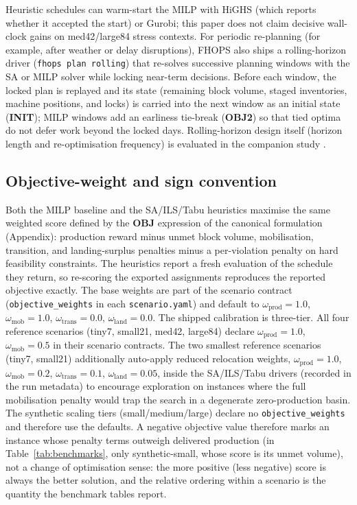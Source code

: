 Heuristic schedules can warm-start the MILP with HiGHS (which reports whether it accepted the start) or Gurobi; this paper does not claim decisive wall-clock gains on med42/large84 stress contexts. For periodic re-planning (for example, after weather or delay disruptions), FHOPS also ships a rolling-horizon driver (\texttt{fhops plan rolling}) that re-solves successive planning windows with the SA or MILP solver while locking near-term decisions. Before each window, the locked plan is replayed and its state (remaining block volume, staged inventories, machine positions, and locks) is carried into the next window as an initial state (\textbf{INIT}); MILP windows add an earliness tie-break (\textbf{OBJ2}) so that tied optima do not defer work beyond the locked days. Rolling-horizon design itself (horizon length and re-optimisation frequency) is evaluated in the companion study \cite{jaffray2026thesis}.

\subsection*{Objective-weight and sign convention}
Both the MILP baseline and the SA/ILS/Tabu heuristics maximise the same weighted score defined by the \textbf{OBJ} expression of the canonical formulation (Appendix): production reward minus unmet block volume, mobilisation, transition, and landing-surplus penalties minus a per-violation penalty on hard feasibility constraints. The heuristics report a fresh evaluation of the schedule they return, so re-scoring the exported assignments reproduces the reported objective exactly. The base weights are part of the scenario contract (\texttt{objective\_weights} in each \texttt{scenario.yaml}) and default to $\omega_{\text{prod}}=1.0$, $\omega_{\text{mob}}=1.0$, $\omega_{\text{trans}}=0.0$, $\omega_{\text{land}}=0.0$. The shipped calibration is three-tier. All four reference scenarios (tiny7, small21, med42, large84) declare $\omega_{\text{prod}}=1.0$, $\omega_{\text{mob}}=0.5$ in their scenario contracts. The two smallest reference scenarios (tiny7, small21) additionally auto-apply reduced relocation weights, $\omega_{\text{prod}}=1.0$, $\omega_{\text{mob}}=0.2$, $\omega_{\text{trans}}=0.1$, $\omega_{\text{land}}=0.05$, inside the SA/ILS/Tabu drivers (recorded in the run metadata) to encourage exploration on instances where the full mobilisation penalty would trap the search in a degenerate zero-production basin. The synthetic scaling tiers (small/medium/large) declare no \texttt{objective\_weights} and therefore use the defaults. A negative objective value therefore marks an instance whose penalty terms outweigh delivered production (in Table~\ref{tab:benchmarks}, only synthetic-small, whose score is its unmet volume), not a change of optimisation sense: the more positive (less negative) score is always the better solution, and the relative ordering within a scenario is the quantity the benchmark tables report.

